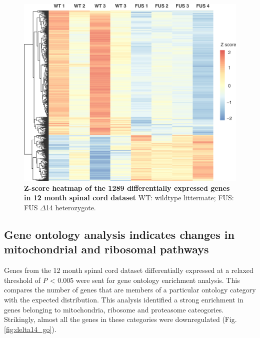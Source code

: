 \begin{figure}[h!]
	\centering
	\includegraphics[width=\textwidth]{Figures/04_fus_mice/anny_normalised_heatmap.png}
	\caption[Z-score heatmap of the 12 month spinal cord dataset]{
		\textbf{Z-score heatmap of the 1289 differentially expressed genes in 12 month spinal cord dataset}
	WT: wildtype littermate; FUS: FUS $\Delta$14 heterozygote. 
}
	\label{fig:delta14_heatmap}
\end{figure}


\subsection{Gene ontology analysis indicates changes in mitochondrial and ribosomal pathways}
Genes from the 12 month spinal cord dataset differentially expressed at a relaxed threshold of \textit{P} < 0.005 were sent for gene ontology enrichment analysis. This compares the number of genes that are members of a particular ontology category with the expected distribution. This analysis identified a strong enrichment in genes belonging to mitochondria, ribosome and proteasome cateogories. Strikingly, almost all the genes in these categories were downregulated (Fig. \ref{fig:delta14_go}).

